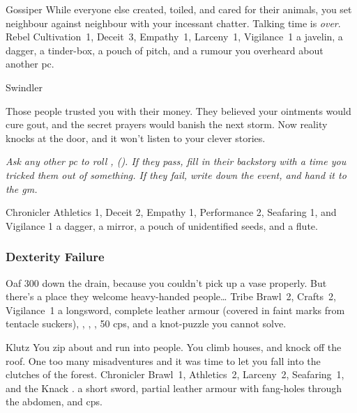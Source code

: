 \begin{multicols}{2}
\begin{itemize}
    {Gossiper}%
    {
      While everyone else created, toiled, and cared for their animals, you set neighbour against neighbour with your incessant chatter.
      Talking time is \emph{over}.
    }%
    {Rebel}%
    {Cultivation~1, Deceit~3, Empathy~1, Larceny~1, Vigilance~1}%
    {a javelin, a dagger, a tinder-box, a pouch of pitch,%
      and a rumour you overheard about another \gls{pc}.}%

    {Swindler}%
    {
      Those people trusted you with their money.
      They believed your ointments would cure gout, and the secret prayers would banish the next storm.
      Now reality knocks at the door, and it won't listen to your clever stories.

      \textit{Ask any other \gls{pc} to roll , (\tn[8]).
      If they pass, fill in their backstory with a time you tricked them out of something.
      If they fail, write down the event, and hand it to the \gls{gm}.}
    }%
    {Chronicler}%
    {Athletics 1, Deceit 2, Empathy 1, Performance 2, Seafaring 1, and Vigilance 1}%
    {
      a dagger, a mirror, a pouch of unidentified seeds, and a flute.
    }%

\end{itemize}

\null


\subsubsection{Dexterity Failure}

\nobreak
\begin{itemize}

    {Oaf}%
    {300  down the drain, because you couldn't pick up a vase properly.
      But there's a place they welcome heavy-handed people\ldots
    }%
    {Tribe}%
    {Brawl~2, Crafts~2, Vigilance~1}%
    {a longsword, complete leather armour (covered in faint marks from tentacle suckers), \rations, \rations, \rations, 50 \glspl{cp}, and a knot-puzzle you cannot solve.}%

    {Klutz}%
    {You zip about and run into people.
      You climb houses, and knock off the roof.
      One too many misadventures and it was time to let you fall into the clutches of the forest.}%
    {Chronicler}%
    {Brawl~1, Athletics~2, Larceny~2, Seafaring~1, and the Knack \charge.}%
    {a short sword, partial leather armour with fang-holes through the abdomen, and  \glspl{cp}.}%


\end{itemize}
\end{multicols}
